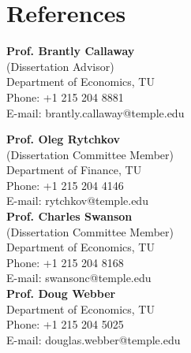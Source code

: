 \documentclass[letterpaper]{article}
\begin{document}
\section*{References}
\vspace{-.15in}
\begin{multicols}{2}
	
	\textbf{Prof. Brantly Callaway} \\
	(Dissertation Advisor)\\
	Department of Economics, TU \\
	\hfill {Phone: +1 215 204 8881}\\
	\hfill{E-mail: {\color{blue}brantly.callaway@temple.edu}}
	
	\vspace{.2in}
	
	\textbf{Prof. Oleg Rytchkov}\\
	(Dissertation Committee Member)\\
	Department of Finance, TU\\
	\hfill Phone: +1 215 204 4146\\
	\hfill{E-mail: {\color{blue}rytchkov@temple.edu}}\\

		\columnbreak
	\textbf{Prof. Charles Swanson} \\
		(Dissertation Committee Member)\\
	Department of Economics, TU \\
	\hfill {Phone: +1 215 204 8168}\\
	\hfill{E-mail: {\color{blue}swansonc@temple.edu}}\\

	\textbf{Prof. Doug Webber} \\
	Department of Economics, TU \\
	\hfill{Phone: +1 215 204 5025} \\
	\hfill{E-mail: {\color{blue}douglas.webber@temple.edu}}\\
	
%	
\end{multicols}
\end{document}

